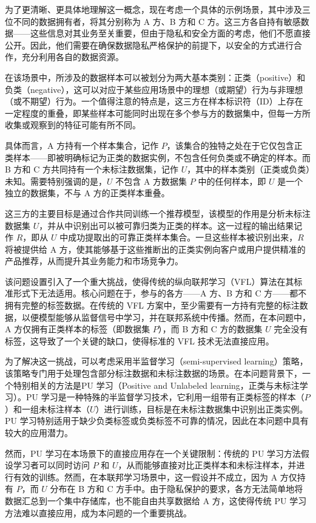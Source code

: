 为了更清晰、更具体地理解这一概念，现在考虑一个具体的示例场景，其中涉及三位不同的数据拥有者，将其分别称为 A 方、B 方和 C 方。这三方各自持有敏感数据——这些信息对其业务至关重要，但由于隐私和安全方面的考虑，他们不愿直接公开。因此，他们需要在确保数据隐私严格保护的前提下，以安全的方式进行合作，充分利用各自的数据资源。

在该场景中，所涉及的数据样本可以被划分为两大基本类别：正类（positive）和负类（negative），这可以对应于某些应用场景中的理想（或期望）行为与非理想（或不期望）行为。一个值得注意的特点是，这三方在样本标识符（ID）上存在一定程度的重叠，即某些样本可能同时出现在多个参与方的数据集中，但每一方所收集或观察到的特征可能有所不同。

具体而言，A 方持有一个样本集合，记作 $ P $，该集合的独特之处在于它仅包含正类样本——即被明确标记为正类的数据实例，不包含任何负类或不确定的样本。而 B 方和 C 方共同持有一个未标注数据集，记作 $ U $，其中的样本类别（正类或负类）未知。需要特别强调的是，$ U $ 不包含 A 方数据集 $ P $ 中的任何样本，即 $ U $ 是一个独立的数据集，不与 A 方的正类样本重叠。

这三方的主要目标是通过合作共同训练一个推荐模型，该模型的作用是分析未标注数据集 $ U $，并从中识别出可以被可靠归类为正类的样本。这一过程的输出结果记作 $ R $，即从 $ U $ 中成功提取出的可靠正类样本集合。一旦这些样本被识别出来，$ R $ 将被提供给 A 方，使其能够基于这些推断出的正类实例向客户或用户提供精准的产品推荐，从而提升其业务能力和市场竞争力。

该问题设置引入了一个重大挑战，使得传统的纵向联邦学习（VFL）算法在其标准形式下无法适用。核心问题在于，参与的各方——A 方、B 方和 C 方——都不拥有完整的标签数据。在传统的 VFL 方案中，至少需要有一方持有完整的标注数据，以便模型能够从监督信号中学习，并在联邦系统中传播。然而，在本问题中，A 方仅拥有正类样本的标签（即数据集 $ P $），而 B 方和 C 方的数据集 $ U $ 完全没有标签，这导致了一个关键的缺口，使得标准的 VFL 技术无法直接应用。

为了解决这一挑战，可以考虑采用半监督学习（semi-supervised learning）策略，该策略专门用于处理包含部分标注数据和未标注数据的场景。在本问题背景下，一个特别相关的方法是PU 学习（Positive and Unlabeled learning，正类与未标注学习）。PU 学习是一种特殊的半监督学习技术，它利用一组带有正类标签的样本（$ P $）和一组未标注样本（$ U $）进行训练，目标是在未标注数据集中识别出正类实例。PU 学习特别适用于缺少负类标签或负类标签不可靠的情况，因此在本问题中具有较大的应用潜力。

然而，PU 学习在本场景下的直接应用存在一个关键限制：传统的 PU 学习方法假设学习者可以同时访问 $ P $ 和 $ U $，从而能够直接对比正类样本和未标注样本，并进行有效的训练。然而，在本联邦学习场景中，这一假设并不成立，因为 A 方仅持有 $ P $，而 $ U $ 分布在 B 方和 C 方手中。由于隐私保护的要求，各方无法简单地将数据汇总到一个集中存储库，也不能自由共享数据给 A 方，这使得传统 PU 学习方法难以直接应用，成为本问题的一个重要挑战。

